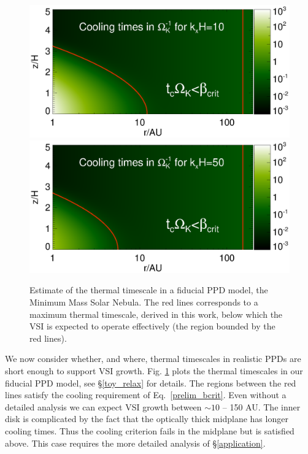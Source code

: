\documentclass[iop, numberedappendix]{emulateapj}
\begin{document}
\begin{figure}
  \includegraphics[width=\linewidth,clip=true,trim=0cm 1.7cm 0cm
  0.73cm]{figures/bcrit_mmsn2d_kx10}
  \includegraphics[width=\linewidth,clip=true,trim=0cm 0.46cm 0cm
  0.73cm]{figures/bcrit_mmsn2d_kx50}
  \caption{Estimate of the thermal timescale  in a fiducial 
    PPD model, the Minimum Mass Solar Nebula. The red
    lines corresponds to a maximum thermal timescale, derived in
    this work, below which the VSI is expected to operate effectively
    (the region bounded by the red lines).     
    \label{bcrit_mmsn2d} 
  }
\end{figure}

We now consider whether, and where, thermal timescales in realistic PPDs
are short enough to support VSI growth.  Fig. \ref{bcrit_mmsn2d} plots the
 thermal timescales in our fiducial PPD model, see \S\ref{toy_relax} for details.
 The regions between the red lines satisfy the cooling requirement of Eq.\ \ref{prelim_bcrit}.
 Even without a detailed analysis we can expect VSI growth between $\sim 10$ -- 150 AU.
 The inner disk is complicated by the fact that the optically thick midplane has longer cooling times. 
 Thus the cooling criterion fails in the midplane but is satisfied above.  This case requires the 
 more detailed analysis of \S\ref{application}.
 
\end{document}
